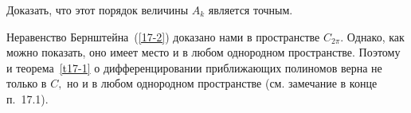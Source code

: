  \task %
 Доказать, что этот порядок величины $A_k$ является точным.

 \begin{Remark} %
 Неравенство Бернштейна~(\ref{17-2}) доказано нами в пространстве $C_{2\pi}.$
 Однако, как можно показать, оно имеет место и в любом однородном пространстве. Поэтому и
 теорема~\ref{t17-1} о дифференцировании приближающих полиномов
 верна не только в $C,$ но и в любом однородном пространстве (см. замечание в конце п.~17.1).
 \end{Remark}
